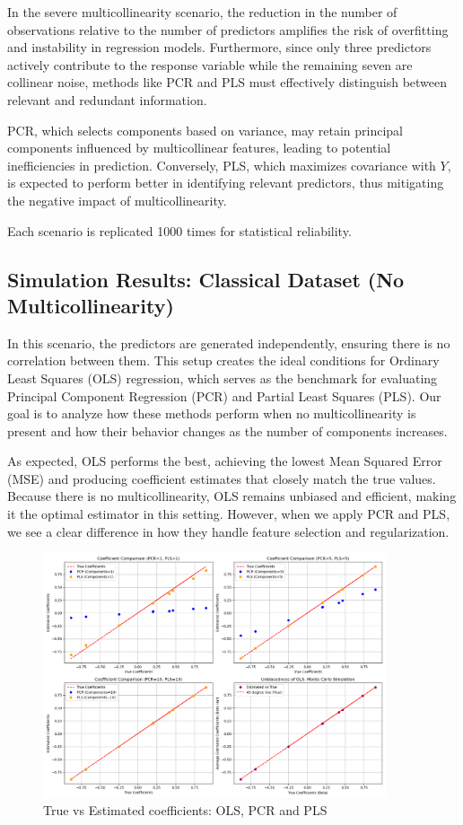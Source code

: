 \documentclass[11pt,twoside,a4paper]{article}
\begin{document}
In the severe multicollinearity scenario, the reduction in the number of observations relative to the number of predictors amplifies the risk of overfitting and instability in regression models. Furthermore, since only three predictors actively contribute to the response variable while the remaining seven are collinear noise, methods like PCR and PLS must effectively distinguish between relevant and redundant information. 

PCR, which selects components based on variance, may retain principal components influenced by multicollinear features, leading to potential inefficiencies in prediction. Conversely, PLS, which maximizes covariance with \( Y \), is expected to perform better in identifying relevant predictors, thus mitigating the negative impact of multicollinearity.

Each scenario is replicated 1000 times for statistical reliability.


\subsection{Simulation Results: Classical Dataset (No Multicollinearity)}  

In this scenario, the predictors are generated independently, ensuring there is no correlation between them. This setup creates the ideal conditions for Ordinary Least Squares (OLS) regression, which serves as the benchmark for evaluating Principal Component Regression (PCR) and Partial Least Squares (PLS). Our goal is to analyze how these methods perform when no multicollinearity is present and how their behavior changes as the number of components increases.

As expected, OLS performs the best, achieving the lowest Mean Squared Error (MSE) and producing coefficient estimates that closely match the true values. Because there is no multicollinearity, OLS remains unbiased and efficient, making it the optimal estimator in this setting. However, when we apply PCR and PLS, we see a clear difference in how they handle feature selection and regularization.  

\begin{figure}[H]
    \centering
    \includegraphics[width=0.9\textwidth]{First_plot.png}
    \caption{True vs Estimated coefficients: OLS, PCR and PLS}
    \label{fig:PLS_analysis}
\end{figure}
\end{document}
